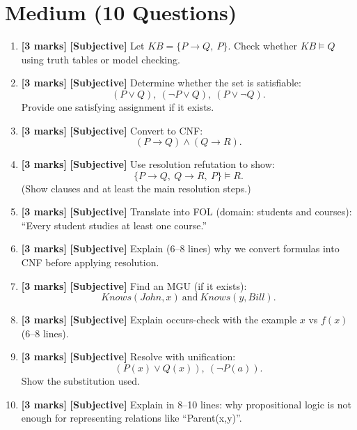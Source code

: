 \documentclass[11pt,a4paper]{article}
\newcommand{\MMarks}{\textbf{[3 marks]} }
\begin{document}
\section*{Medium (10 Questions)}
\begin{enumerate}[label=\textbf{M\arabic*.}, leftmargin=*]
  \item \MMarks \textbf{[Subjective]} Let $KB=\{P \rightarrow Q,\ P\}$.
    Check whether $KB \models Q$ using truth tables or model checking.

  \item \MMarks \textbf{[Subjective]} Determine whether the set is satisfiable:
    \[
      (P \lor Q),\ (\lnot P \lor Q),\ (P \lor \lnot Q).
    \]
    Provide one satisfying assignment if it exists.

  \item \MMarks \textbf{[Subjective]} Convert to CNF:
    \[
      (P \rightarrow Q) \land (Q \rightarrow R).
    \]

  \item \MMarks \textbf{[Subjective]} Use resolution refutation to show:
    \[
      \{P \rightarrow Q,\ Q \rightarrow R,\ P\} \models R.
    \]
    (Show clauses and at least the main resolution steps.)

  \item \MMarks \textbf{[Subjective]} Translate into FOL (domain: students and courses):
    ``Every student studies at least one course.''

  \item \MMarks \textbf{[Subjective]} Explain (6--8 lines) why we convert formulas into CNF before applying resolution.

  \item \MMarks \textbf{[Subjective]} Find an MGU (if it exists):
    \[
      Knows(John, x)\ \text{and}\ Knows(y, Bill).
    \]

  \item \MMarks \textbf{[Subjective]} Explain occurs-check with the example $x$ vs $f(x)$ (6--8 lines).

  \item \MMarks \textbf{[Subjective]} Resolve with unification:
    \[
      (P(x) \lor Q(x)),\ (\lnot P(a)).
    \]
    Show the substitution used.

  \item \MMarks \textbf{[Subjective]} Explain in 8--10 lines: why propositional logic is not enough for representing relations like ``Parent(x,y)''.
\end{enumerate}
\end{document}
